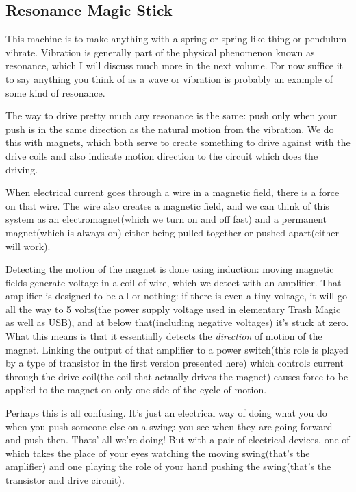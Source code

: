 \subsection{Resonance Magic Stick}\label{resonance-magic-stick}

This machine is to make anything with a spring or spring like thing or
pendulum vibrate. Vibration is generally part of the physical phenomenon
known as resonance, which I will discuss much more in the next volume.
For now suffice it to say anything you think of as a wave or vibration
is probably an example of some kind of resonance.

The way to drive pretty much any resonance is the same: push only when
your push is in the same direction as the natural motion from the
vibration. We do this with magnets, which both serve to create something
to drive against with the drive coils and also indicate motion direction
to the circuit which does the driving.

When electrical current goes through a wire in a magnetic field, there
is a force on that wire. The wire also creates a magnetic field, and we
can think of this system as an electromagnet(which we turn on and off
fast) and a permanent magnet(which is always on) either being pulled
together or pushed apart(either will work).

Detecting the motion of the magnet is done using induction: moving
magnetic fields generate voltage in a coil of wire, which we detect with
an amplifier. That amplifier is designed to be all or nothing: if there
is even a tiny voltage, it will go all the way to 5 volts(the power
supply voltage used in elementary Trash Magic as well as USB), and at
below that(including negative voltages) it's stuck at zero. What this
means is that it essentially detects the \emph{direction} of motion of
the magnet. Linking the output of that amplifier to a power switch(this
role is played by a type of transistor in the first version presented
here) which controls current through the drive coil(the coil that
actually drives the magnet) causes force to be applied to the magnet on
only one side of the cycle of motion.

Perhaps this is all confusing. It's just an electrical way of doing what
you do when you push someone else on a swing: you see when they are
going forward and push then. Thats' all we're doing! But with a pair of
electrical devices, one of which takes the place of your eyes watching
the moving swing(that's the amplifier) and one playing the role of your
hand pushing the swing(that's the transistor and drive circuit).

